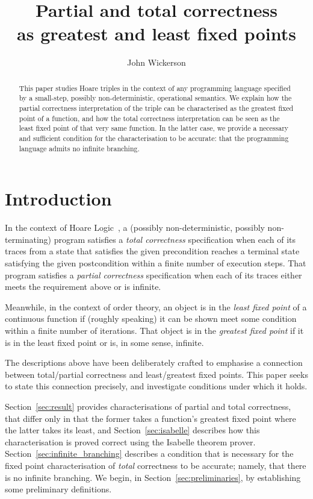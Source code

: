 \documentclass{llncs}
\title{Partial and total correctness \\ as greatest and least fixed points}
\author{John Wickerson}
\institute{Imperial College London}
\begin{document}
\maketitle

\thispagestyle{plain}
\pagestyle{plain}

\begin{abstract}
This paper studies Hoare triples in the context of any programming
language specified by a small-step, possibly non-deterministic,
operational semantics. We explain how the partial correctness
interpretation of the triple can be characterised as the greatest
fixed point of a function, and how the total correctness
interpretation can be seen as the least fixed point of that very same
function. In the latter case, we provide a necessary and sufficient
condition for the characterisation to be accurate: that the
programming language admits no infinite branching.
\end{abstract}

\section{Introduction}

In the context of Hoare Logic~\cite{hoare69}, a (possibly
non-deterministic, possibly non-terminating) program satisfies a
\emph{total correctness} specification when each of its traces from a
state that satisfies the given precondition reaches a terminal state
satisfying the given postcondition within a finite number of execution
steps. That program satisfies a \emph{partial correctness}
specification when each of its traces either meets the requirement
above or is infinite. 

Meanwhile, in the context of order theory, an
object is in the \emph{least fixed point} of a continuous function if
(roughly speaking) it can be shown meet some condition within a finite
number of iterations. That object is in the \emph{greatest fixed
point} if it is in the least fixed point or is, in some sense,
infinite.

The descriptions above have been deliberately crafted to emphasise a
connection between total/partial correctness and least/greatest fixed
points. This paper seeks to state this connection precisely, and
investigate conditions under which it holds.

Section~\ref{sec:result} provides characterisations of partial and
total correctness, that differ only in that the former takes a
function's greatest fixed point where the latter takes its least, and
Section~\ref{sec:isabelle} describes how this characterisation is
proved correct using the Isabelle theorem
prover. Section~\ref{sec:infinite_branching} describes a condition
that is necessary for the fixed point characterisation of \emph{total}
correctness to be accurate; namely, that there is no infinite
branching. We begin, in Section~\ref{sec:preliminaries}, by
establishing some preliminary definitions.
\end{document}
